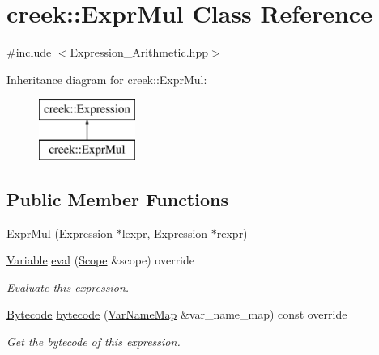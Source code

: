 \hypertarget{classcreek_1_1_expr_mul}{}\section{creek\+:\+:Expr\+Mul Class Reference}
\label{classcreek_1_1_expr_mul}


{\ttfamily \#include $<$Expression\+\_\+\+Arithmetic.\+hpp$>$}

Inheritance diagram for creek\+:\+:Expr\+Mul\+:\begin{figure}[H]
\begin{center}
\leavevmode
\includegraphics[height=2.000000cm]{classcreek_1_1_expr_mul}
\end{center}
\end{figure}
\subsection*{Public Member Functions}
\begin{DoxyCompactItemize}
\item 
\hyperlink{classcreek_1_1_expr_mul_a577226c6b039900255208eff1897a956}{Expr\+Mul} (\hyperlink{classcreek_1_1_expression}{Expression} $\ast$lexpr, \hyperlink{classcreek_1_1_expression}{Expression} $\ast$rexpr)
\item 
\hyperlink{classcreek_1_1_variable}{Variable} \hyperlink{classcreek_1_1_expr_mul_a285e95e75af0a5eea988b8b943057f82}{eval} (\hyperlink{classcreek_1_1_scope}{Scope} \&scope) override
\begin{DoxyCompactList}\small\item\em Evaluate this expression. \end{DoxyCompactList}\item 
\hyperlink{classcreek_1_1_bytecode}{Bytecode} \hyperlink{classcreek_1_1_expr_mul_ac9c387f1c0e4ec6dd6480d56dbb4cdac}{bytecode} (\hyperlink{classcreek_1_1_var_name_map}{Var\+Name\+Map} \&var\+\_\+name\+\_\+map) const  override\hypertarget{classcreek_1_1_expr_mul_ac9c387f1c0e4ec6dd6480d56dbb4cdac}{}\label{classcreek_1_1_expr_mul_ac9c387f1c0e4ec6dd6480d56dbb4cdac}

\begin{DoxyCompactList}\small\item\em Get the bytecode of this expression. \end{DoxyCompactList}\end{DoxyCompactItemize}


